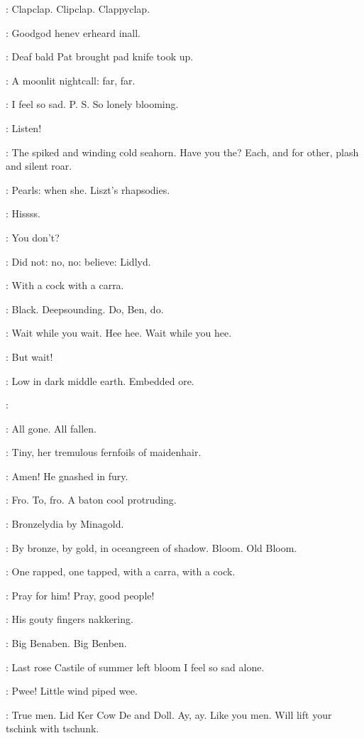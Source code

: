 :
Clapclap. Clipclap. Clappyclap.

\BloomInt:
Goodgod henev erheard inall.

:
Deaf bald Pat brought pad knife
took up.

\BloomInt:
A moonlit nightcall: far, far.

\BloomInt:
I feel so sad. P. S. So lonely blooming.

:
Listen!

\BloomInt:
The spiked and winding cold seahorn. Have you the? Each, and for other,
plash and silent roar.

\BloomInt:
Pearls: when she. Liszt's rhapsodies.

:
Hissss.

\BloomInt:
You don't?

\BloomInt:
Did not: no, no: believe: Lidlyd.

:
With a cock with a carra.

\BloomInt:
Black. Deepsounding. Do, Ben, do.

\BloomInt:
Wait while you wait. Hee hee.
Wait while you hee.

\BloomInt:
But wait!

\BloomInt:
Low in dark middle earth. Embedded ore.

\BloomInt:

\BloomInt:
All gone. All fallen.

\BloomInt:
Tiny, her tremulous fernfoils of maidenhair.

:
Amen! He gnashed in fury.

:
Fro. To, fro. A baton cool protruding.

\BloomInt:
Bronzelydia by Minagold.

:
By bronze, by gold, in oceangreen of shadow. Bloom. Old Bloom.

:
One rapped, one tapped,
with a carra, with a cock.

\BloomInt:
Pray for him! Pray, good people!

:
His gouty fingers nakkering.

\BloomInt:
Big Benaben. Big Benben.

\BloomInt:
Last rose Castile of summer left bloom I feel so sad alone.

\BloomInt:
Pwee! Little wind piped wee.

\BloomInt:
True men. Lid Ker Cow De and Doll. Ay, ay. Like you men. Will lift your
tschink with tschunk.

